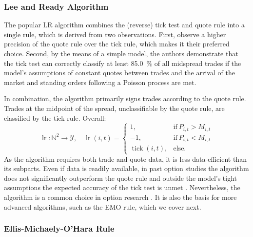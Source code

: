 \subsubsection{Lee and Ready Algorithm}\label{sec:lee-and-ready-algorithm}

The popular \gls{LR} algorithm \autocite[][745]{leeInferringTradeDirection1991} combines the (reverse) tick test and quote rule into a single rule, which is derived from two observations. First, \textcite[][735--743]{leeInferringTradeDirection1991} observe a higher precision of the quote rule over the tick rule, which makes it their preferred choice. Second, by the means of a simple model, the authors demonstrate that the tick test can correctly classify at least \SI{85.0}{\percent} of all midspread trades if the model's assumptions of constant quotes between trades and the arrival of the market and standing orders following a Poisson process are met.

In combination, the algorithm primarily signs trades according to the quote rule. Trades at the midpoint of the spread, unclassifiable by the quote rule, are classified by the tick rule. Overall:
\begin{equation}
    \operatorname{lr} \colon \mathbb{N}^2 \to \mathcal{Y},\quad\operatorname{lr}(i,t)=
    \begin{cases}
        1,                         & \mathrm{if}\ P_{i, t} > M_{i, t} \\
        -1,                        & \mathrm{if}\ P_{i, t} < M_{i, t} \\
        \operatorname{tick}(i, t), & \mathrm{else}.
    \end{cases}
\end{equation}
As the algorithm requires both trade and quote data, it is less data-efficient than its subparts. Even if data is readily available, in past option studies the algorithm does not significantly outperform the quote rule and outside the model's tight assumptions the expected accuracy of the tick test is unmet \autocites[][30--32]{grauerOptionTradeClassification2022}[][886]{savickasInferringDirectionOption2003}. Nevertheless, the algorithm is a common choice in option research \autocite[cp.][453]{easleyOptionVolumeStock1998}. It is also the basis for more advanced algorithms, such as the \gls{EMO} rule, which we cover next.

\subsubsection{Ellis-Michaely-O'Hara
    Rule}\label{sec:ellis-michaely-ohara-rule}

